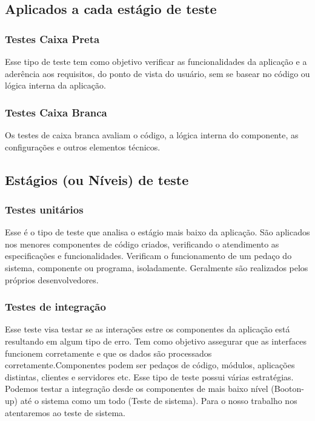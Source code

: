 \subsection{Aplicados a cada estágio de teste}

\subsubsection{Testes Caixa Preta}

Esse tipo de teste tem como objetivo verificar as funcionalidades da aplicação e a aderência aos requisitos, do ponto de vista do usuário, sem se basear no código ou lógica interna da aplicação.

\subsubsection{Testes Caixa Branca}

Os testes de caixa branca avaliam o código, a lógica interna do componente, as configurações e outros elementos técnicos.

\subsection{Estágios (ou Níveis) de teste}

\subsubsection{Testes unitários}

Esse é o tipo de teste que analisa o estágio mais baixo da aplicação. São aplicados nos menores componentes de código criados, verificando o atendimento as especificações e funcionalidades. Verificam o funcionamento de um pedaço do sistema, componente ou programa,  isoladamente. Geralmente são realizados pelos próprios desenvolvedores.

\subsubsection{Testes de integração}

Esse teste visa testar se as interações estre os componentes da aplicação está resultando em algum tipo de erro. Tem como objetivo assegurar que as interfaces funcionem corretamente e que os dados são processados corretamente.Componentes podem ser pedaços de código, módulos, aplicações distintas, clientes e servidores etc. Esse tipo de teste possui várias estratégias. Podemos testar a integração desde os componentes de mais baixo nível (Booton-up)  até o sistema como um todo (Teste de sistema). Para o nosso trabalho nos atentaremos ao teste de sistema.

